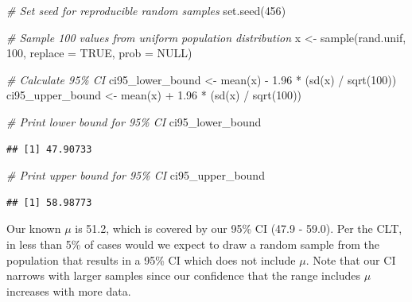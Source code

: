 \documentclass[
]{book}
\newenvironment{Shaded}{\begin{snugshade}}{\end{snugshade}}
\newcommand{\AttributeTok}[1]{\textcolor[rgb]{0.77,0.63,0.00}{#1}}
\newcommand{\CommentTok}[1]{\textcolor[rgb]{0.56,0.35,0.01}{\textit{#1}}}
\newcommand{\ConstantTok}[1]{\textcolor[rgb]{0.00,0.00,0.00}{#1}}
\newcommand{\DecValTok}[1]{\textcolor[rgb]{0.00,0.00,0.81}{#1}}
\newcommand{\FloatTok}[1]{\textcolor[rgb]{0.00,0.00,0.81}{#1}}
\newcommand{\FunctionTok}[1]{\textcolor[rgb]{0.00,0.00,0.00}{#1}}
\newcommand{\NormalTok}[1]{#1}
\newcommand{\OtherTok}[1]{\textcolor[rgb]{0.56,0.35,0.01}{#1}}
\newcommand{\SpecialCharTok}[1]{\textcolor[rgb]{0.00,0.00,0.00}{#1}}
\begin{document}
\begin{Shaded}
\begin{Highlighting}[]
\CommentTok{\# Set seed for reproducible random samples}
\FunctionTok{set.seed}\NormalTok{(}\DecValTok{456}\NormalTok{)}

\CommentTok{\# Sample 100 values from uniform population distribution}
\NormalTok{x }\OtherTok{\textless{}{-}} \FunctionTok{sample}\NormalTok{(rand.unif, }\DecValTok{100}\NormalTok{, }\AttributeTok{replace =} \ConstantTok{TRUE}\NormalTok{, }\AttributeTok{prob =} \ConstantTok{NULL}\NormalTok{)}

\CommentTok{\# Calculate 95\% CI}
\NormalTok{ci95\_lower\_bound }\OtherTok{\textless{}{-}} \FunctionTok{mean}\NormalTok{(x) }\SpecialCharTok{{-}} \FloatTok{1.96} \SpecialCharTok{*}\NormalTok{ (}\FunctionTok{sd}\NormalTok{(x) }\SpecialCharTok{/} \FunctionTok{sqrt}\NormalTok{(}\DecValTok{100}\NormalTok{))}
\NormalTok{ci95\_upper\_bound }\OtherTok{\textless{}{-}} \FunctionTok{mean}\NormalTok{(x) }\SpecialCharTok{+} \FloatTok{1.96} \SpecialCharTok{*}\NormalTok{ (}\FunctionTok{sd}\NormalTok{(x) }\SpecialCharTok{/} \FunctionTok{sqrt}\NormalTok{(}\DecValTok{100}\NormalTok{))}
\end{Highlighting}
\end{Shaded}

\begin{Shaded}
\begin{Highlighting}[]
\CommentTok{\# Print lower bound for 95\% CI}
\NormalTok{ci95\_lower\_bound}
\end{Highlighting}
\end{Shaded}

\begin{verbatim}
## [1] 47.90733
\end{verbatim}

\begin{Shaded}
\begin{Highlighting}[]
\CommentTok{\# Print upper bound for 95\% CI}
\NormalTok{ci95\_upper\_bound}
\end{Highlighting}
\end{Shaded}

\begin{verbatim}
## [1] 58.98773
\end{verbatim}

Our known \(\mu\) is 51.2, which is covered by our 95\% CI (47.9 - 59.0). Per the CLT, in less than 5\% of cases would we expect to draw a random sample from the population that results in a 95\% CI which does not include \(\mu\). Note that our CI narrows with larger samples since our confidence that the range includes \(\mu\) increases with more data.
\end{document}
